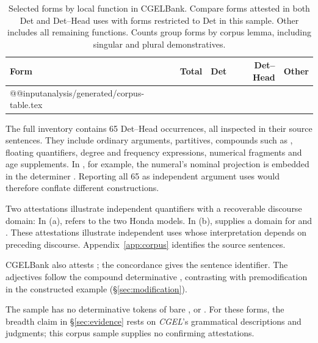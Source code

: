 \documentclass[12pt]{article}
\makeatletter
\newcommand{\tablebody}[1]{\csname @@input\endcsname #1 }
\makeatother
\begin{document}
\begin{table}[H]
\centering\small
\caption{Selected forms by local function in CGELBank. Compare forms attested in both Det and Det--Head uses with forms restricted to Det in this sample. Other includes all remaining functions. Counts group forms by corpus lemma, including singular and plural demonstratives.}\label{tab:corpus}
\begin{tabular}{lrrrr}
\toprule
Form & Total & Det & Det--Head & Other \\
\midrule
\tablebody{analysis/generated/corpus-table.tex}
\bottomrule
\end{tabular}
\end{table}

The full inventory contains 65 Det--Head occurrences, all inspected in their source sentences. They include ordinary arguments, partitives, compounds such as , floating quantifiers, degree and frequency expressions, numerical fragments and age supplements. In , for example, the numeral's nominal projection is embedded in the determiner . Reporting all 65 as independent argument uses would therefore conflate different constructions.

Two attestations illustrate independent quantifiers with a recoverable discourse domain:
\ea\label{ex:attested-quantifiers}
\ea {}
\ex {}
\z\z
In (a),  refers to the two Honda models. In (b),  supplies a domain for  and . These attestations illustrate independent uses whose interpretation depends on preceding discourse. Appendix~\ref{app:corpus} identifies the source sentences.

CGELBank also attests ; the concordance gives the sentence identifier. The adjectives follow the compound determinative , contrasting with premodification in the constructed example  (§\ref{sec:modification}).

The sample has no determinative tokens of bare ,  or . For these forms, the breadth claim in §\ref{sec:evidence} rests on \textit{CGEL}'s grammatical descriptions and judgments; this corpus sample supplies no confirming attestations.
\end{document}
